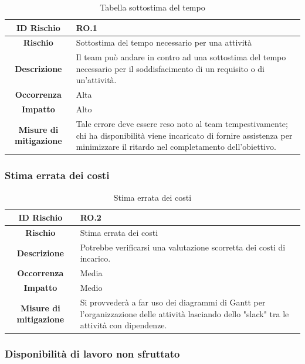 \documentclass[10pt, a4paper]{article}
\begin{document}
{\renewcommand{\arraystretch}{1.5}
\begin{table}[H]
\begin{tabularx}{\textwidth}{c|X}
\textbf{ID Rischio} & RO.1 \\
\hline
\textbf{Rischio} & Sottostima del tempo necessario per una attività\\
\hline
\textbf{Descrizione} & Il team può andare in contro ad una sottostima del tempo necessario per il soddisfacimento di un requisito o di un'attività.\\
\hline
\textbf{Occorrenza} & Alta\\
\hline
\textbf{Impatto} & Alto\\
\hline
\textbf{Misure di mitigazione} & Tale errore deve essere reso noto al team tempestivamente; chi ha disponibilità viene incaricato di fornire assistenza per minimizzare il ritardo nel completamento dell'obiettivo.\\
\end{tabularx}
\caption{Tabella sottostima del tempo}
\end{table}

\subsubsection{Stima errata dei costi}

{\renewcommand{\arraystretch}{1.5}
\begin{table}[H]
\begin{tabularx}{\textwidth}{c|X}
\textbf{ID Rischio} & RO.2 \\
\hline
\textbf{Rischio} & Stima errata dei costi \\
\hline
\textbf{Descrizione} & Potrebbe verificarsi una valutazione scorretta dei costi di incarico.\\
\hline
\textbf{Occorrenza} & Media\\
\hline
\textbf{Impatto} & Medio\\
\hline
\textbf{Misure di mitigazione} & Si provvederà a far uso dei diagrammi di Gantt per l'organizzazione delle attività lasciando dello "slack" tra le attività con dipendenze.\\
\end{tabularx}
\caption{Stima errata dei costi}
\end{table}



\subsubsection{Disponibilità di lavoro non sfruttato}

}}
\end{document}
